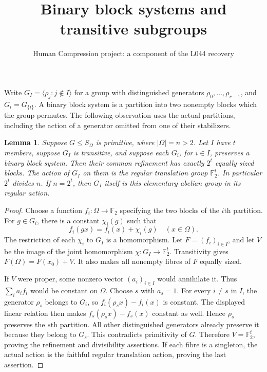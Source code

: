 \documentclass[11pt,a4paper]{article}
\title{Binary block systems and transitive subgroups}
\author{Human Compression project: a component of the L044 recovery}
\date{}
\newtheorem{lemma}{Lemma}
\newcommand{\gen}[1]{\langle #1\rangle}
\begin{document}
\maketitle

Write $G_I=\gen{\rho_j:j\notin I}$ for a group with distinguished
generators $\rho_0,\ldots,\rho_{r-1}$, and $G_i=G_{\{i\}}$.
A binary block system is a partition into two nonempty blocks which
the group permutes. The following observation uses the actual
partitions, including the action of a generator omitted from one
of their stabilizers.

\begin{lemma}\label{binary}
Suppose $G\le S_\Omega$ is primitive, where $|\Omega|=n>2$.
Let $I$ have $t$ members, suppose $G_I$ is transitive, and suppose
each $G_i$, for $i\in I$, preserves a binary block system.
Then their common refinement has exactly $2^t$ equally sized blocks.
The action of $G_I$ on them is the regular translation group
$\mathbb F_2^t$. In particular $2^t$ divides $n$.
If $n=2^t$, then $G_I$ itself is this elementary abelian group in
its regular action.
\end{lemma}
\begin{proof}
Choose a function $f_i:\Omega\to\mathbb F_2$ specifying the two
blocks of the $i$th partition. For $g\in G_i$, there is a constant
$\chi_i(g)$ such that
\[
                  f_i(gx)=f_i(x)+\chi_i(g)\quad(x\in\Omega).
\]
The restriction of each $\chi_i$ to $G_I$ is a homomorphism.
Let $F=(f_i)_{i\in I}$, and let $V$ be the image of the joint
homomorphism $\chi:G_I\to\mathbb F_2^t$. Transitivity gives
$F(\Omega)=F(x_0)+V$. It also makes all nonempty fibres of $F$
equally sized.

If $V$ were proper, some nonzero vector $(a_i)_{i\in I}$ would
annihilate it. Thus $\sum_i a_i f_i$ would be constant on $\Omega$.
Choose $s$ with $a_s=1$. For every $i\ne s$ in $I$, the generator
$\rho_s$ belongs to $G_i$, so $f_i(\rho_s x)-f_i(x)$ is constant.
The displayed linear relation then makes
$f_s(\rho_s x)-f_s(x)$ constant as well. Hence $\rho_s$ preserves
the $s$th partition. All other distinguished generators already
preserve it because they belong to $G_s$. This contradicts
primitivity of $G$. Therefore $V=\mathbb F_2^t$, proving the
refinement and divisibility assertions. If each fibre is a
singleton, the actual action is the faithful regular translation
action, proving the last assertion.
\end{proof}
\end{document}
